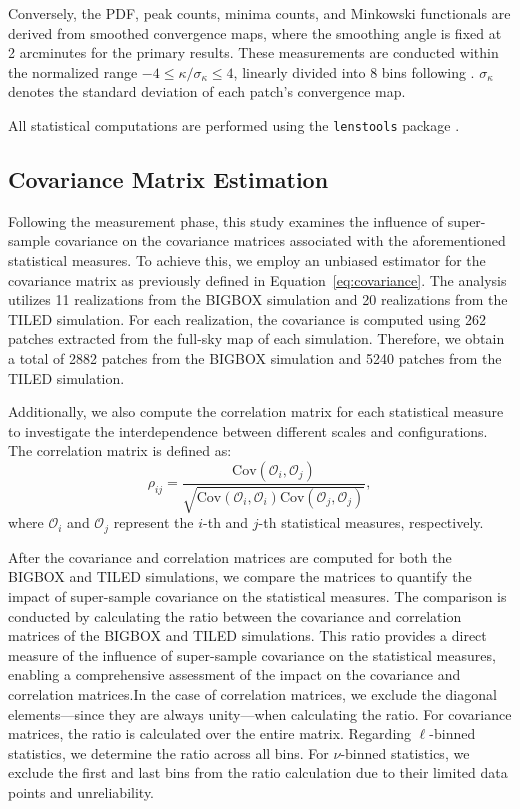 Conversely, the PDF, peak counts, minima counts, and Minkowski functionals are derived from smoothed convergence maps, where the smoothing angle is fixed at 2 arcminutes for the primary results. These measurements are conducted within the normalized range $-4 \leq \kappa/\sigma_{\kappa} \leq 4$, linearly divided into 8 bins following \citet{2021A&A...648A.115M}. $\sigma_{\kappa}$ denotes the standard deviation of each patch's convergence map.

All statistical computations are performed using the \texttt{lenstools} package \citep{2016A&C....17...73P}.

\subsection{Covariance Matrix Estimation}
Following the measurement phase, this study examines the influence of super-sample covariance on the covariance matrices associated with the aforementioned statistical measures. To achieve this, we employ an unbiased estimator for the covariance matrix as previously defined in Equation~\ref{eq:covariance}. The analysis utilizes 11 realizations from the BIGBOX simulation and 20 realizations from the TILED simulation. For each realization, the covariance is computed using 262 patches extracted from the full-sky map of each simulation.
Therefore, we obtain a total of 2882 patches from the BIGBOX simulation and 5240 patches from the TILED simulation. 

Additionally, we also compute the correlation matrix for each statistical measure to investigate the interdependence between different scales and configurations. The correlation matrix is defined as:
\begin{equation}
    \rho_{ij} = \frac{\text{Cov}(\mathcal{O}_i, \mathcal{O}_j)}{\sqrt{\text{Cov}(\mathcal{O}_i, \mathcal{O}_i)\text{Cov}(\mathcal{O}_j, \mathcal{O}_j)}},
\end{equation}
where $\mathcal{O}_i$ and $\mathcal{O}_j$ represent the $i$-th and $j$-th statistical measures, respectively.

After the covariance and correlation matrices are computed for both the BIGBOX and TILED simulations, we compare the matrices to quantify the impact of super-sample covariance on the statistical measures. The comparison is conducted by calculating the ratio between the covariance and correlation matrices of the BIGBOX and TILED simulations. This ratio provides a direct measure of the influence of super-sample covariance on the statistical measures, enabling a comprehensive assessment of the impact on the covariance and correlation matrices.In the case of correlation matrices, we exclude the diagonal elements---since they are always unity---when calculating the ratio. For covariance matrices, the ratio is calculated over the entire matrix. Regarding $\ell$-binned statistics, we determine the ratio across all bins. For $\nu$-binned statistics, we exclude the first and last bins from the ratio calculation due to their limited data points and unreliability.